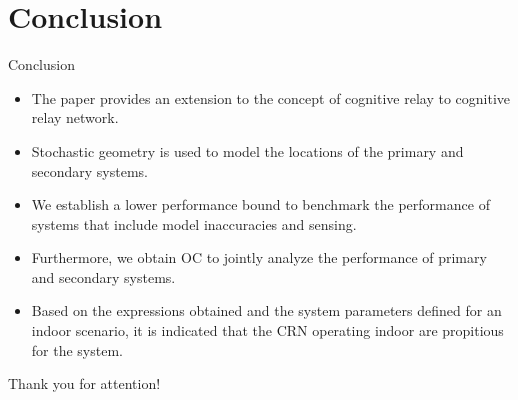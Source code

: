 \documentclass[12pt]{beamer}
\newcommand{\fs}[1]{\fontsize{ #1 pt}{8.2}\selectfont}
\begin{document}
\section{Conclusion}
\begin{frame}{Conclusion}
\fs{8}
\begin{itemize}
\item The paper provides an extension to the concept of cognitive relay to cognitive relay network.
\item Stochastic geometry is used to model the locations of the primary and secondary systems. 
\item  We establish a lower performance bound to benchmark the performance of systems that include model inaccuracies and sensing.
\item Furthermore, we obtain OC to jointly analyze the performance of primary and secondary systems.
\item Based on the expressions obtained and the system parameters defined for an indoor scenario, it is indicated that the CRN operating indoor are propitious for the system. 
\end{itemize}
\end{frame}

\begin{frame}{}
\begin{center}
Thank you for attention! 
\end{center}
\end{frame}

\end{document}
